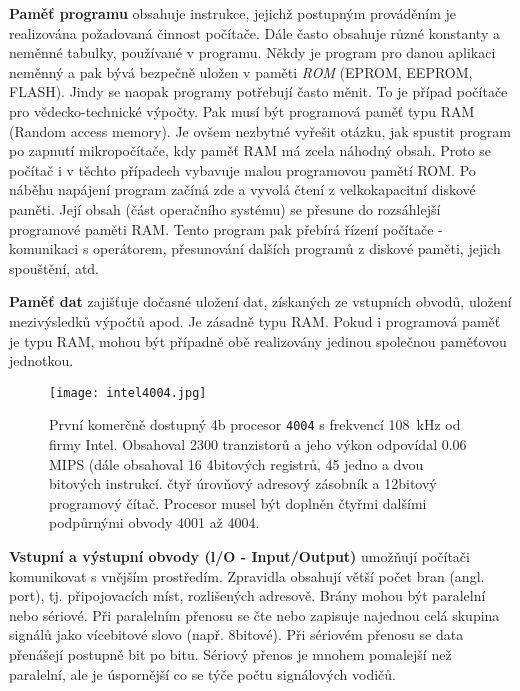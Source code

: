     \textbf{Paměť programu} obsahuje instrukce, jejichž postupným prováděním je realizována 
    požadovaná činnost počítače. Dále často obsahuje různé konstanty a neměnné tabulky, používané v 
    programu. Někdy je program pro danou aplikaci neměnný a pak bývá bezpečně uložen v paměti 
    \emph{ROM} (EPROM, EEPROM, FLASH). Jindy se naopak programy potřebují často měnit. To je případ 
    počítače pro vědecko-technické výpočty. Pak musí být programová paměť typu RAM (Random access 
    memory). Je ovšem nezbytné vyřešit otázku, jak spustit program po zapnutí mikropočítače, kdy 
    paměť RAM má zcela náhodný obsah. Proto se počítač i v těchto případech vybavuje malou 
    programovou pamětí ROM. Po náběhu napájení program začíná zde a vyvolá čtení z velkokapacitní 
    diskové paměti. Její obsah (část operačního systému) se přesune do rozsáhlejší programové 
    paměti RAM. Tento program pak přebírá řízení počítače - komunikaci s operátorem, přesunování 
    dalších programů z diskové paměti, jejich spouštění, atd.
    
    \textbf{Paměť dat} zajišťuje dočasné uložení dat, získaných ze vstupních obvodů, uložení 
    mezivýsledků výpočtů apod. Je zásadně typu RAM. Pokud i programová paměť je typu RAM, mohou být 
    případně obě realizovány jedinou společnou paměťovou jednotkou.

    \begin{figure}[ht!] %
      \centering
      \texttt{[image: intel4004.jpg]}
      \caption{První komerčně dostupný 4b procesor \texttt{4004} s frekvencí \SI{108}{\kHz} od 
        firmy Intel. Obsahoval 2300 tranzistorů a jeho výkon odpovídal 0.06 MIPS (dále 
        obsahoval 16 4bitových registrů, 45 jedno a dvou bitových instrukcí. čtyř úrovňový 
        adresový zásobník a 12bitový programový čítač. Procesor musel být doplněn čtyřmi 
        dalšími podpůrnými obvody 4001 až 4004.}
      \label{MIT:fig_intel4004}
    \end{figure}
    \textbf{Vstupní a výstupní obvody (l/O - Input/Output)} umožňují počítači komunikovat s vnějším 
    prostředím. Zpravidla obsahují větší počet bran (angl. port), tj. připojovacích míst, 
    rozlišených adresově. Brány mohou být paralelní nebo sériové. Při paralelním přenosu se čte 
    nebo zapisuje najednou celá skupina signálů jako vícebitové slovo (např. 8bitové). Při sériovém 
    přenosu se data přenášejí postupně bit po bitu. Sériový přenos je mnohem pomalejší než 
    paralelní, ale je úspornější co se týče počtu signálových vodičů.

